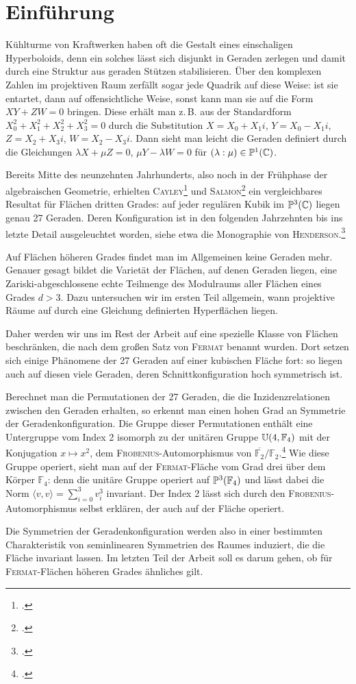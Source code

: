 \chapter{Einführung} \label{chap:intro}
Kühlturme von Kraftwerken haben oft die Gestalt eines einschaligen Hyperboloids, denn ein solches lässt sich disjunkt in Geraden zerlegen und damit durch eine Struktur aus geraden Stützen stabilisieren. Über den komplexen Zahlen im projektiven Raum zerfällt sogar jede Quadrik auf diese Weise: ist sie entartet, dann auf offensichtliche Weise, sonst kann man sie auf die Form $XY + ZW = 0$ bringen. Diese erhält man z.\,B. aus der Standardform $X_0^2+X_1^2+X_2^2+X_3^2=0$ durch die Substitution $X = X_0 + X_1i$, $Y = X_0 - X_1i$, $Z = X_2 + X_3i$, $W = X_2 - X_3i$. Dann sieht man leicht die Geraden definiert durch die Gleichungen $\lambda X + \mu Z = 0$, $\mu Y - \lambda W = 0$ für $(\lambda:\mu) \in \mathbb P^{1}(\mathbb C)$.

Bereits Mitte des neunzehnten Jahrhunderts, also noch in der Frühphase der algebraischen Geometrie, erhielten \textsc{Cayley}\footcite{Cayley} und \textsc{Salmon}\footcite{Salmon} ein vergleichbares Resultat für Flächen dritten Grades: auf jeder regulären Kubik im $\mathbb P^{3}(\mathbb C)$ liegen genau 27 Geraden. Deren Konfiguration ist in den folgenden Jahrzehnten bis ins letzte Detail ausgeleuchtet worden, siehe etwa die Monographie von \textsc{Henderson}.\footcite{Henderson}

Auf Flächen höheren Grades findet man im Allgemeinen keine Geraden mehr. Genauer gesagt bildet die Varietät der Flächen, auf denen Geraden liegen, eine Zariski-abgeschlossene echte Teilmenge des Modulraums aller Flächen eines Grades $d > 3$. Dazu untersuchen wir im ersten Teil allgemein, wann projektive Räume auf durch eine Gleichung definierten Hyperflächen liegen.

Daher werden wir uns im Rest der Arbeit auf eine spezielle Klasse von Flächen beschränken, die nach dem großen Satz von \textsc{Fermat} benannt wurden. Dort setzen sich einige Phänomene der 27 Geraden auf einer kubischen Fläche fort: so liegen auch auf diesen viele Geraden, deren Schnittkonfiguration hoch symmetrisch ist.

Berechnet man die Permutationen der 27 Geraden, die die Inzidenzrelationen zwischen den Geraden erhalten, so erkennt man einen hohen Grad an Symmetrie der Geradenkonfiguration. Die Gruppe dieser Permutationen enthält eine Untergruppe vom Index 2 isomorph zu der unitären Gruppe $\mathbb U(4,\mathbb F_4)$ mit der Konjugation $x \mapsto x^2$, dem \textsc{Frobenius}-Automorphismus von $\overline{\mathbb F_2}/\mathbb F_2$.\footcite[Aufg.~C--D, S.~180]{Mumford} Wie diese Gruppe operiert, sieht man auf der \textsc{Fermat}-Fläche vom Grad drei über dem Körper $\mathbb F_4$: denn die unitäre Gruppe operiert auf $\mathbb P^{3}(\mathbb F_4)$ und lässt dabei die Norm $\langle v, v \rangle = \sum_{i=0}^3 v_i^3$ invariant. Der Index 2 lässt sich durch den \textsc{Frobenius}-Automorphismus selbst erklären, der auch auf der Fläche operiert.

Die Symmetrien der Geradenkonfiguration werden also in einer bestimmten Charakteristik von seminlinearen Symmetrien des Raumes induziert, die die Fläche invariant lassen. Im letzten Teil der Arbeit soll es darum gehen, ob für \textsc{Fermat}-Flächen höheren Grades ähnliches gilt.
